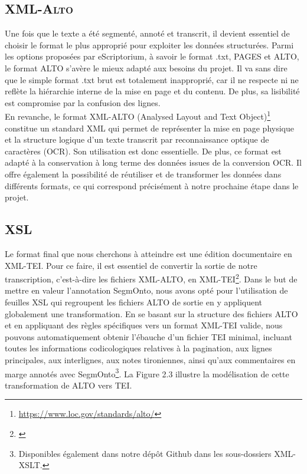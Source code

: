 \documentclass[a4paper, twoside, 12pt]{book}
\begin{document}
\subsection{\textsc{XML-Alto}}

Une fois que le texte a été segmenté, annoté et transcrit, il devient essentiel de choisir le format le plus approprié pour exploiter les données structurées. Parmi les options proposées par eScriptorium, à savoir le format .txt, PAGES et ALTO, le format ALTO s'avère le mieux adapté aux besoins du projet. Il va sans dire que le simple format .txt brut est totalement inapproprié, car il ne respecte ni ne reflète la hiérarchie interne de la mise en page et du contenu. De plus, sa lisibilité est compromise par la confusion des lignes.\\

En revanche, le format XML-ALTO (Analysed Layout and Text Object)\footnote{\url{https://www.loc.gov/standards/alto/}} constitue un standard XML qui permet de représenter la mise en page physique et la structure logique d'un texte transcrit par reconnaissance optique de caractères (OCR). Son utilisation est donc essentielle. De plus, ce format est adapté à la conservation à long terme des données issues de la conversion OCR. Il offre également la possibilité de réutiliser et de transformer les données dans différents formats, ce qui correspond précisément à notre prochaine étape dans le projet.

\subsection{XSL}

Le format final que nous cherchons à atteindre est une édition documentaire en XML-TEI. Pour ce faire, il est essentiel de convertir la sortie de notre transcription, c'est-à-dire les fichiers XML-ALTO, en XML-TEI\footnote{\cite{janes2021towards}}. Dans le but de mettre en valeur l'annotation SegmOnto, nous avons opté pour l'utilisation de feuilles XSL qui regroupent les fichiers ALTO de sortie en y appliquent globalement une transformation. En se basant sur la structure des fichiers ALTO et en appliquant des règles spécifiques vers un format XML-TEI valide, nous pouvons automatiquement obtenir l'ébauche d'un fichier TEI \og{}minimal\fg{}, incluant toutes les informations codicologiques relatives à la pagination, aux lignes principales, aux interlignes, aux notes tironiennes, ainsi qu'aux commentaires en marge annotés avec SegmOnto\footnote{Disponibles également dans notre dépôt Github dans les sous-dossiers XML-XSLT.}. La Figure 2.3 illustre la modélisation de cette transformation de ALTO vers TEI.
\end{document}
